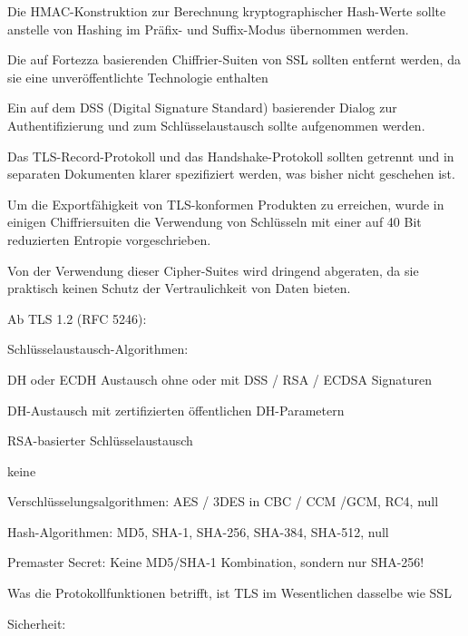 \documentclass[a4paper]{article}
\begin{document}
\begin{multicols}{3}
\begin{itemize*}
\begin{itemize*}
                  \begin{itemize*}
                        \item Die HMAC-Konstruktion zur Berechnung kryptographischer Hash-Werte sollte anstelle von Hashing im Präfix- und Suffix-Modus übernommen werden.
                        \item Die auf Fortezza basierenden Chiffrier-Suiten von SSL sollten entfernt werden, da sie eine unveröffentlichte Technologie enthalten
                        \item Ein auf dem DSS (Digital Signature Standard) basierender Dialog zur Authentifizierung und zum Schlüsselaustausch sollte aufgenommen werden.
                        \item Das TLS-Record-Protokoll und das Handshake-Protokoll sollten getrennt und in separaten Dokumenten klarer spezifiziert werden, was bisher nicht geschehen ist.
                  \end{itemize*}
                  \item
                  Um die Exportfähigkeit von TLS-konformen Produkten zu erreichen, wurde
                  in einigen Chiffriersuiten die Verwendung von Schlüsseln mit einer auf
                  40 Bit reduzierten Entropie vorgeschrieben.

                  \begin{itemize*}
                        \item Von der Verwendung dieser Cipher-Suites wird dringend abgeraten, da sie praktisch keinen Schutz der Vertraulichkeit von Daten bieten.
                  \end{itemize*}
                  \item
                  Ab TLS 1.2 (RFC 5246):

                  \begin{itemize*}
                        \item Schlüsselaustausch-Algorithmen:
                        \begin{itemize*} \item DH oder ECDH Austausch ohne oder mit DSS / RSA / ECDSA Signaturen \item DH-Austausch mit zertifizierten öffentlichen DH-Parametern \item RSA-basierter Schlüsselaustausch \item keine \end{itemize*}
                        \item Verschlüsselungsalgorithmen: AES / 3DES in CBC / CCM /GCM, RC4, null
                        \item Hash-Algorithmen: MD5, SHA-1, SHA-256, SHA-384, SHA-512, null
                        \item Premaster Secret: Keine MD5/SHA-1 Kombination, sondern nur SHA-256!
                  \end{itemize*}
                  \item
                  Was die Protokollfunktionen betrifft, ist TLS im Wesentlichen dasselbe
                  wie SSL
                  \item
                  Sicherheit:


\end{itemize*}
\end{itemize*}
\end{multicols}
\end{document}
